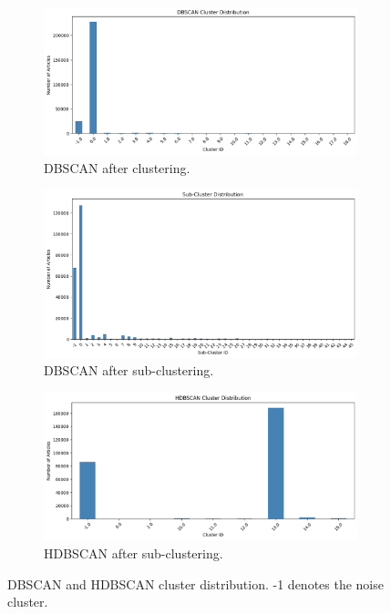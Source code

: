 \documentclass[twocolumn]{article}
\begin{document}
\begin{figure}[h!]
    \centering
    \begin{subfigure}[t]{0.49\textwidth}
        \centering
        \includegraphics[width=\textwidth]{dbscan_distribution.png}
        \caption{DBSCAN after clustering.}
        \label{fig:dbscan-high-cluster}
    \end{subfigure}
    \hfill

    \begin{subfigure}[t]{0.49\textwidth}
        \centering
        \includegraphics[width=\textwidth]{dbscan subcluster.png}
        \caption{DBSCAN after sub-clustering.}
        \label{fig:dbscan-subcluster}
    \end{subfigure}
    \hfill
    \begin{subfigure}[t]{0.49\textwidth}
        \centering
        \includegraphics[width=\textwidth]{HDBSCAN_subcluster_distribution.png}
        \caption{HDBSCAN after sub-clustering.}
        \label{fig:hdbscan-subcluster}
    \end{subfigure}


    \caption{DBSCAN and HDBSCAN cluster distribution. -1 denotes the noise cluster.}
    \label{fig:dbscan-both}
\end{figure}
\end{document}
